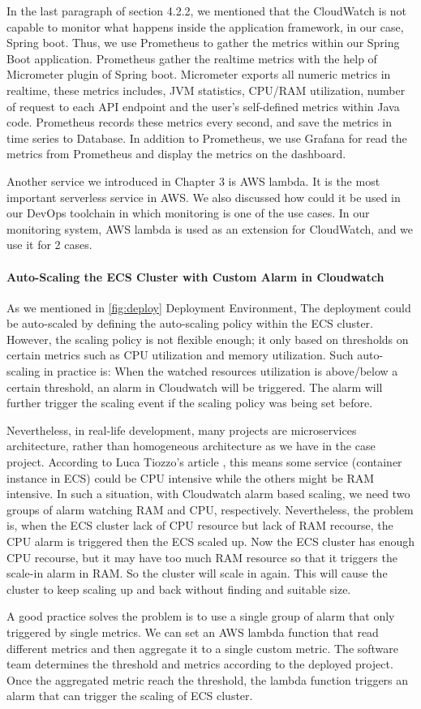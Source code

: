 \par
In the last paragraph of section 4.2.2, we mentioned that the CloudWatch is not capable to monitor what happens inside the application framework, in our case, Spring boot. Thus, we use Prometheus to gather the metrics within our Spring Boot application. Prometheus gather the realtime metrics with the help of Micrometer plugin of Spring boot. Micrometer exports all numeric metrics in realtime, these metrics includes, JVM statistics, CPU/RAM utilization, number of request to each API endpoint and the user's self-defined metrics within Java code. Prometheus records these metrics every second, and save the metrics in time series to Database. In addition to Prometheus, we use Grafana for read the metrics from Prometheus and display the metrics on the dashboard.
\par
Another service we introduced in Chapter 3 is AWS lambda. It is the most important serverless service in AWS. We also discussed how could it be used in our DevOps toolchain in which monitoring is one of the use cases. In our monitoring system, AWS lambda is used as an extension for CloudWatch, and we use it for 2 cases.
\paragraph[]{Auto-Scaling the ECS Cluster with Custom Alarm in Cloudwatch}
As we mentioned in \ref{fig:deploy} Deployment Environment, The deployment could be auto-scaled by defining the auto-scaling policy within the ECS cluster. However, the scaling policy is not flexible enough; it only based on thresholds on certain metrics such as CPU utilization and memory utilization. Such auto-scaling in practice is: When the watched resources utilization is above/below a certain threshold, an alarm in Cloudwatch will be triggered. The alarm will further trigger the scaling event if the scaling policy was being set before.
\par
Nevertheless, in real-life development, many projects are microservices architecture, rather than homogeneous architecture as we have in the case project. According to Luca Tiozzo's article \cite{AWSECSho47:online}, this means some service (container instance in ECS) could be CPU intensive while the others might be RAM intensive. In such a situation, with Cloudwatch alarm based scaling, we need two groups of alarm watching RAM and CPU, respectively. Nevertheless, the problem is, when the ECS cluster lack of CPU resource but lack of RAM recourse, the CPU alarm is triggered then the ECS scaled up. Now the ECS cluster has enough CPU recourse, but it may have too much RAM resource so that it triggers the scale-in alarm in RAM. So the cluster will scale in again. This will cause the cluster to keep scaling up and back without finding and suitable size.
\par
A good practice solves the problem is to use a single group of alarm that only triggered by single metrics. We can set an AWS lambda function that read different metrics and then aggregate it to a single custom metric. The software team determines the threshold and metrics according to the deployed project. Once the aggregated metric reach the threshold, the lambda function triggers an alarm that can trigger the scaling of ECS cluster. 
